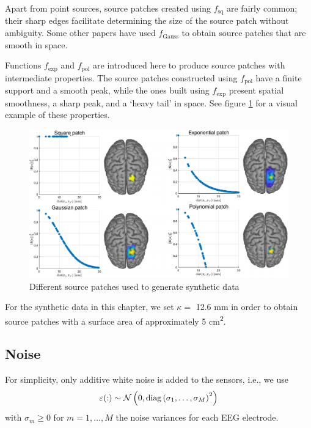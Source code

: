%
Apart from point sources, source patches created using $f_\text{sq}$ are fairly common; their sharp edges facilitate determining the size of the source patch without ambiguity.
%
Some other papers have used $f_\text{Gauss}$ to obtain source patches that are smooth in space. 

Functions $f_\text{exp}$ and $f_\text{pol}$ are introduced here to produce source patches with intermediate properties.
%
The source patches constructed using $f_\text{pol}$ have a finite support and a smooth peak, while the ones built using $f_\text{exp}$ present spatial smoothness, a sharp peak, and a `heavy tail' in space.
%
See figure \ref{fig:exaple_true} for a visual example of these properties.

\begin{figure}
\centering
\includegraphics[width=\linewidth]{./img/profiles.pdf}
\caption{Different source patches used to generate synthetic data}
\label{fig:exaple_true}
\end{figure}


For the synthetic data in this chapter, we set $\kappa = $ 12.6 \si{mm} in order to obtain source patches with a surface area of approximately 5 \si{cm^2}.

\subsection{Noise}

For simplicity, only additive white noise is added to the sensors, i.e., we use 
\begin{equation}
    \varepsilon(:) \sim \mathcal{N} \left( 0, \text{diag}\left(  \sigma_1, \dots, \sigma_M  \right)^2 \right)
\end{equation}
with $\sigma_m \geq 0$ for $m=1, \dots, M$ the noise variances for each EEG electrode.

